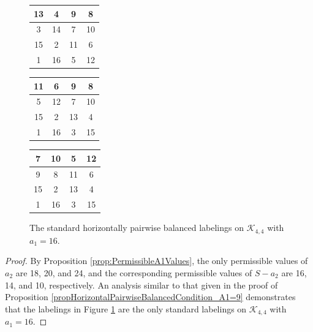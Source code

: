 \documentclass[10pt, reqno]{amsart}
\theoremstyle{definition}
\theoremstyle{plain}
\begin{document}
 \begin{figure}[hbt!]
    \centering
    \begin{tabular}{|c|c|c|c|} \hline
        13 &4   &9   &8   \\  \hline
        3  &14   &7   &10  \\  \hline
        15 &2   &11  &6   \\  \hline
        1  &16  &5   &12  \\  \hline
    \end{tabular}
\hspace{0.15in}\begin{tabular}{|c|c|c|c|} \hline
        11 &6   &9   &8   \\  \hline
        5  &12   &7   &10  \\  \hline
        15 &2   &13  &4   \\  \hline
        1  &16  &3   &15  \\  \hline
    \end{tabular}
 \hspace{0.15in}   \begin{tabular}{|c|c|c|c|} \hline
        7  &10  &5  &12  \\  \hline
        9  &8    &11  &6  \\  \hline
        15 &2   &13  &4  \\  \hline
        1  &16  &3   &15  \\  \hline
    \end{tabular}
    \caption{The standard horizontally pairwise balanced labelings on
    $\mathcal{K}_{4,4}$ with $a_1=16$.}
    \label{fig:StandHorzLabelsA1=16}
\end{figure}

\begin{proof}
    By Proposition \ref{prop:PermissibleA1Values}, the only
    permissible values of $a_2$ are 18, 20, and 24,
    and the corresponding permissible values of $S-a_2$
    are 16, 14, and 10, respectively.
    An analysis similar to that given in the proof of
    Proposition \ref{propHorizontalPairwiseBalancedCondition_A1=9}
    demonstrates that the labelings in Figure \ref{fig:StandHorzLabelsA1=16} are the only standard
    labelings on $\mathcal{K}_{4,4}$ with $a_1=16$.
\end{proof}
\end{document}
